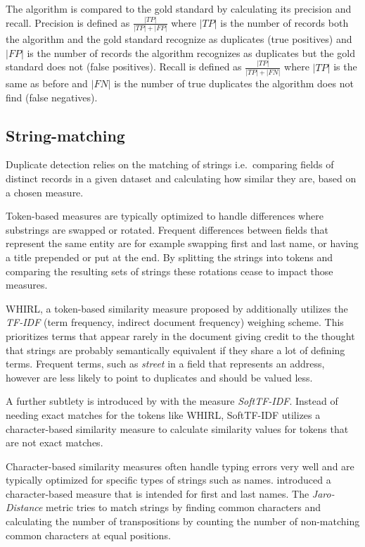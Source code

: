 \documentclass[conference]{IEEEtran}
\begin{document}
The algorithm is compared to the gold standard by calculating its precision and recall. Precision is defined as $\frac{|TP|}{|TP|+|FP|}$ where $|TP|$ is the number of records both the algorithm and the gold standard recognize as duplicates (true positives) and $|FP|$ is the number of records the algorithm recognizes as duplicates but the gold standard does not (false positives). Recall is defined as $\frac{|TP|}{|TP|+|FN|}$ where $|TP|$ is the same as before and $|FN|$ is the number of true duplicates the algorithm does not find (false negatives).

\subsection{String-matching}
Duplicate detection relies on the matching of strings i.e.\ comparing fields of distinct records in a given dataset and calculating how similar they are, based on a chosen measure.

Token-based measures are typically optimized to handle differences where substrings are swapped or rotated. Frequent differences between fields that represent the same entity are for example swapping first and last name, or having a title prepended or put at the end. By splitting the strings into tokens and comparing the resulting sets of strings these rotations cease to impact those measures.

WHIRL, a token-based similarity measure proposed by \cite{Cohen.1998} additionally utilizes the \emph{TF-IDF} (term frequency, indirect document frequency) weighing scheme. This prioritizes terms that appear rarely in the document giving credit to the thought that strings are probably semantically equivalent if they share a lot of defining terms. Frequent terms, such as \emph{street} in a field that represents an address, however are less likely to point to duplicates and should be valued less.

A further subtlety is introduced by \cite{Bilenko.2003} with the measure \emph{SoftTF-IDF}. Instead of needing exact matches for the tokens like WHIRL, SoftTF-IDF utilizes a character-based similarity measure to calculate similarity values for tokens that are not exact matches.

Character-based similarity measures often handle typing errors very well and are typically optimized for specific types of strings such as names. \textcite{Jaro.1978} introduced a character-based measure that is intended for first and last names. The \emph{Jaro-Distance} metric tries to match strings by finding common characters and calculating the number of transpositions by counting the number of non-matching common characters at equal positions.
\end{document}
